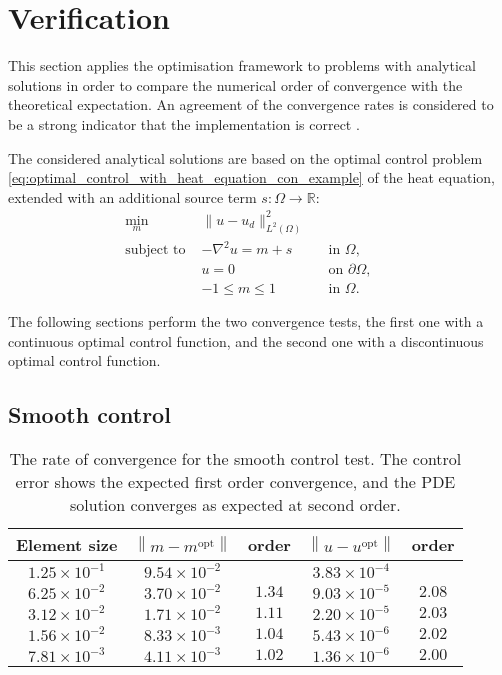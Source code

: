 \documentclass[prodmode,acmtoms]{acmsmall}
\begin{document}
\section{Verification}\label{sec:verification}
This section applies the optimisation framework to problems with analytical solutions in order to compare the numerical order of convergence with the theoretical expectation.
An agreement of the convergence rates is considered to be a strong  indicator that the implementation is correct \cite{salari2000}.

The considered analytical solutions are based on the optimal control problem \eqref{eq:optimal_control_with_heat_equation_con_example} of the heat equation, extended with an additional source term $s: \Omega \to \mathbb R$:
\begin{equation}
\begin{aligned}
\min_m~&\|u -u_d\|_{L^2(\Omega)}^2 \\ 
 \textrm{subject to } & 
 - \nabla^2 u = m + s && \textrm{in } \Omega, \\& u  = 0 && \textrm{on } \partial \Omega, \\
                      & -1  \le m \le 1 && \textrm{in } \Omega. &&
\end{aligned}\label{eq:optimal_control_mms_test}\end{equation}


The following sections perform the two convergence tests, the first one with a continuous optimal control function, and the second one with a discontinuous optimal control function.

\subsection{Smooth control}



\begin{table}[t]
\centering
  \begin{tabular}{ccccc}
    Element size & \small{$\left\| m - m^{\mathrm{opt}}\right\|$} & order & \small{$\left\|u-u^{\mathrm{opt}} \right\|$} & order \\
    \hline
    $1.25 \times 10^{-1}$ & $9.54 \times 10^{-2}$ &  & $3.83 \times 10^{-4}$ & \\
    $6.25 \times 10^{-2}$ & $3.70 \times 10^{-2}$ & $1.34$ & $9.03 \times 10^{-5}$ & $2.08$ \\
    $3.12 \times 10^{-2}$ & $1.71 \times 10^{-2}$ & $1.11$ & $2.20 \times 10^{-5}$ & $2.03$ \\
    $1.56 \times 10^{-2}$ & $8.33 \times 10^{-3}$ & $1.04$ & $5.43 \times 10^{-6}$ & $2.02$ \\
    $7.81 \times 10^{-3}$ & $4.11 \times 10^{-3}$ & $1.02$ & $1.36 \times 10^{-6}$ & $2.00$ \\
  \end{tabular}
\caption{The rate of convergence for the smooth control test. The control error shows the expected first order convergence,
and the PDE solution converges as expected at second order.}
  \label{fig:rate_of_convergence_smooth}
\end{table}
\end{document}
